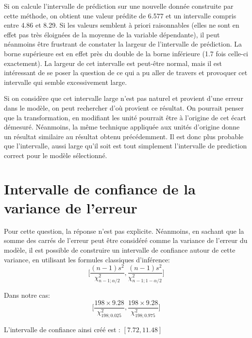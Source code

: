 \documentclass[11pt,a4paper]{article}
\begin{document}
Si on calcule l'intervalle de prédiction sur une nouvelle donnée construite par cette méthode, on obtient une valeur prédite de 6.577 et un intervalle compris entre 4.86 et 8.29. Si les valeurs semblent à priori raisonnables (elles ne sont en effet pas très éloignées de la moyenne de la variable dépendante), il peut néanmoins être frustrant de constater la largeur de l'intervalle de prédiction. La borne supérieure est en effet près du double de la borne inférieure (1.7 fois celle-ci exactement). La largeur de cet intervalle est peut-être normal, mais il est intéressant de se poser la question de ce qui a pu aller de travers et provoquer cet intervalle qui semble excessivement large.

Si on considère que cet intervalle large n'est pas naturel et provient d'une erreur dans le modèle, on peut rechercher d'où provient ce résultat. On pourrait penser que la transformation, en modifiant les unité pourrait être à l'origine de cet écart démesuré. Néanmoins, la même technique appliquée aux unités d'origine donne un résultat similaire au résultat obtenu précédemment. 
Il est donc plus probable que l'intervalle, aussi large qu'il soit est tout simplement l'intervalle de prediction correct pour le modèle sélectionné.

\section{Intervalle de confiance de la variance de l'erreur}
Pour cette question, la réponse n'est pas explicite. Néanmoins, en sachant que la somme des carrés de l'erreur peut être considéré comme la variance de l'erreur du modèle, il est possible de construire un intervalle de confiance autour de cette variance, en utilisant les formules classiques d'inférence:
\begin{equation*}
\Bigg[\dfrac{(n-1)s^{2}}{\chi^{2}_{n-1;\alpha/2}},\dfrac{(n-1)s^{2}}{\chi^{2}_{n-1;1-\alpha/2}}\Bigg]
\end{equation*}
\newline

Dans notre cas:
\begin{equation*}
\Bigg[\dfrac{198 \times 9.28}{\chi^{2}_{198;0.025}},\dfrac{198 \times 9.28}{\chi^{2}_{198;0.975}}\Bigg]
\end{equation*}


L'intervalle de confiance ainsi créé est :
$[7.72,11.48]$
\end{document}
